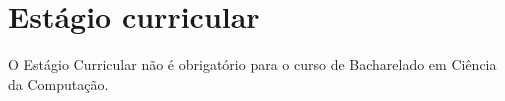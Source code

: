 \section{Estágio curricular}

O Estágio Curricular não é obrigatório para o curso de Bacharelado em Ciência
da Computação.
